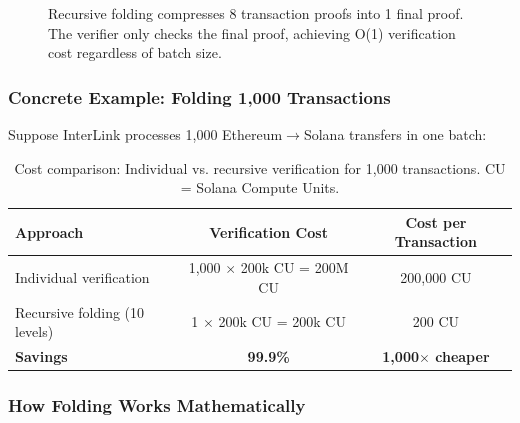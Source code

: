 \documentclass[11pt,a4paper]{article}
\begin{document}
\begin{figure}[H]
{
}
\caption{Recursive folding compresses 8 transaction proofs into 1 final proof. The verifier only checks the final proof, achieving O(1) verification cost regardless of batch size.}
\end{figure}

\subsubsection*{Concrete Example: Folding 1,000 Transactions}

Suppose InterLink processes 1,000 Ethereum$\rightarrow$Solana transfers in one batch:

\begin{table}[H]
\centering
\begin{tabular}{@{}lcc@{}}
\toprule
\textbf{Approach} & \textbf{Verification Cost} & \textbf{Cost per Transaction} \\
\midrule
Individual verification & 1,000 $\times$ 200k CU = 200M CU & 200,000 CU \\
Recursive folding (10 levels) & 1 $\times$ 200k CU = 200k CU & 200 CU \\
\midrule
\textbf{Savings} & \textbf{99.9\%} & \textbf{1,000$\times$ cheaper} \\
\bottomrule
\end{tabular}
\caption{Cost comparison: Individual vs. recursive verification for 1,000 transactions. CU = Solana Compute Units.}
\end{table}

\subsubsection*{How Folding Works Mathematically}
\end{document}
